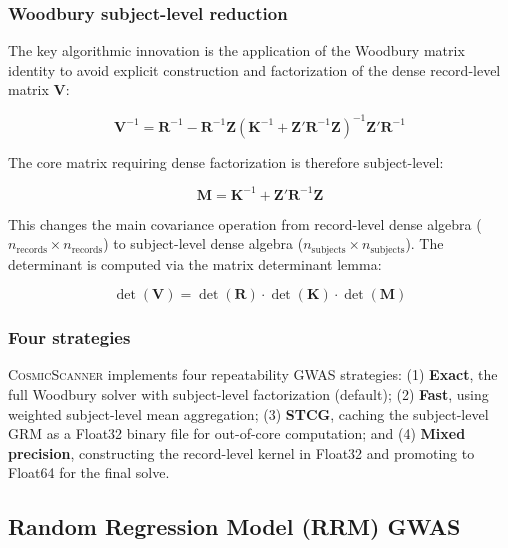 \documentclass[11pt,a4paper]{article}
\newcommand{\CosmicScanner}{\textsc{CosmicScanner}}
\begin{document}
\subsubsection{Woodbury subject-level reduction}

The key algorithmic innovation is the application of the Woodbury matrix identity to avoid explicit construction and factorization of the dense record-level matrix $\mathbf{V}$:

\begin{equation}
\mathbf{V}^{-1} = \mathbf{R}^{-1} - \mathbf{R}^{-1}\mathbf{Z}(\mathbf{K}^{-1} + \mathbf{Z}'\mathbf{R}^{-1}\mathbf{Z})^{-1}\mathbf{Z}'\mathbf{R}^{-1}
\label{eq:woodbury}
\end{equation}

The core matrix requiring dense factorization is therefore subject-level:

\begin{equation}
\mathbf{M} = \mathbf{K}^{-1} + \mathbf{Z}'\mathbf{R}^{-1}\mathbf{Z}
\label{eq:core_matrix}
\end{equation}

This changes the main covariance operation from record-level dense algebra ($n_{\text{records}} \times n_{\text{records}}$) to subject-level dense algebra ($n_{\text{subjects}} \times n_{\text{subjects}}$). The determinant is computed via the matrix determinant lemma:

\begin{equation}
\det(\mathbf{V}) = \det(\mathbf{R}) \cdot \det(\mathbf{K}) \cdot \det(\mathbf{M})
\label{eq:woodbury_det}
\end{equation}

\subsubsection{Four strategies}

\CosmicScanner{} implements four repeatability GWAS strategies: (1) \textbf{Exact}, the full Woodbury solver with subject-level factorization (default); (2) \textbf{Fast}, using weighted subject-level mean aggregation; (3) \textbf{STCG}, caching the subject-level GRM as a Float32 binary file for out-of-core computation; and (4) \textbf{Mixed precision}, constructing the record-level kernel in Float32 and promoting to Float64 for the final solve.

\subsection{Random Regression Model (RRM) GWAS}
\label{sec:rrm}
\end{document}
